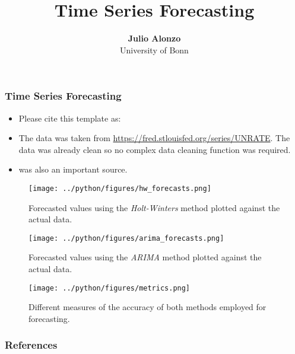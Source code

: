 \documentclass[11pt, aspectratio=169]{beamer}
\begin{document}
\title{Time Series Forecasting}

\author[Julio Alonzo]
{
{\bf Julio Alonzo}\\
{\small University of Bonn}\\[1ex]
}


\begin{frame}
    \titlepage
    \note{~}
\end{frame}


\begin{frame}[t]
    \frametitle{Time Series Forecasting}
    \begin{itemize}
        \item Please cite this template as: \citet{GaudeckerEconProjectTemplates}
        \item The data was taken from \url{https://fred.stlouisfed.org/series/UNRATE}. The data was already clean so no complex data cleaning function was required.
        \item \citet{huang2022applied} was also an important source.
    \end{itemize}
    \note{~}
\end{frame}



\begin{frame}[t]
    \begin{figure}[H]

        \centering
        \texttt{[image: ../python/figures/hw\_forecasts.png]}

        \caption{Forecasted values using the \emph{Holt-Winters} method plotted against the actual data.}
        \label{fig:hw}

    \end{figure}
\end{frame}

\begin{frame}[t]
    \begin{figure}[H]

        \centering
        \texttt{[image: ../python/figures/arima\_forecasts.png]}

        \caption{Forecasted values using the \emph{ARIMA} method plotted against the actual data.}
        \label{fig:arima}

    \end{figure}
\end{frame}

\begin{frame}[t]
    \begin{figure}[H]

        \centering
        \texttt{[image: ../python/figures/metrics.png]}

        \caption{Different measures of the accuracy of both methods employed for forecasting.}
        \label{fig:measures}

    \end{figure}
\end{frame}

\begin{frame}[t]
    
\end{frame}





\begin{frame}[allowframebreaks]
    \frametitle{References}
    \renewcommand{\bibfont}{\normalfont\footnotesize}
    \printbibliography
\end{frame}
\end{document}
